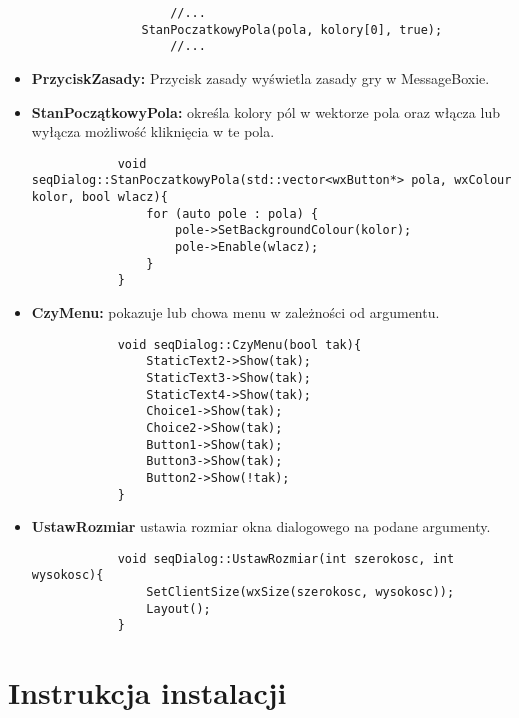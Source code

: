 \documentclass[]{report}
\begin{document}
\begin{itemize}
\begin{itemize}
			\begin{lstlisting}
				//...
			StanPoczatkowyPola(pola, kolory[0], true);
				//...
			\end{lstlisting}
		\end{itemize}
		\item \textbf{PrzyciskZasady:} Przycisk zasady wyświetla zasady gry w MessageBoxie.
		\item \textbf{StanPoczątkowyPola:} określa kolory pól w wektorze pola oraz włącza lub wyłącza możliwość kliknięcia w te pola.
		\begin{lstlisting}
			void seqDialog::StanPoczatkowyPola(std::vector<wxButton*> pola, wxColour kolor, bool wlacz){
				for (auto pole : pola) {
					pole->SetBackgroundColour(kolor);
					pole->Enable(wlacz);
				}
			}
		\end{lstlisting}
		\item \textbf{CzyMenu:} pokazuje lub chowa menu w zależności od argumentu.
		\begin{lstlisting}
			void seqDialog::CzyMenu(bool tak){
				StaticText2->Show(tak);
				StaticText3->Show(tak);
				StaticText4->Show(tak);
				Choice1->Show(tak);
				Choice2->Show(tak);
				Button1->Show(tak);
				Button3->Show(tak);
				Button2->Show(!tak);
			}
		\end{lstlisting}
		\item \textbf{UstawRozmiar} ustawia rozmiar okna dialogowego na podane argumenty.
		\begin{lstlisting}
			void seqDialog::UstawRozmiar(int szerokosc, int wysokosc){
				SetClientSize(wxSize(szerokosc, wysokosc));
				Layout();
			}
		\end{lstlisting}
	\end{itemize}
	
	\newpage
		\section*{Instrukcja instalacji}
	
\end{document}
